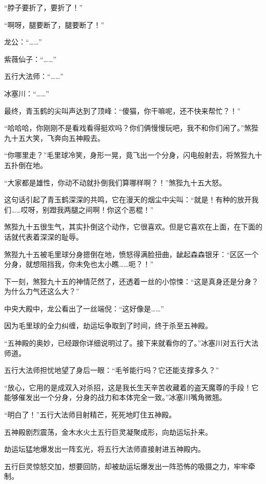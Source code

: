 \begin{this_body}
“脖子要折了，要折了！”

“啊呀，腿要断了，腿要断了！”

龙公：“……”

紫薇仙子：“……”

五行大法师：“……”

冰塞川：“……”

最终，青玉鹤的尖叫声达到了顶峰：“傻猫，你干嘛呢，还不快来帮忙？！”

“哈哈哈，你刚刚不是看戏看得挺欢吗？你们俩慢慢玩吧，我不和你们闹了。”煞狴九十五大笑，飞奔向五神殿去。

“你哪里走？”毛里球冷笑，身形一晃，竟飞出一个分身，闪电般射去，将煞狴九十五扑倒在地。

“大家都是雄性，你动不动就扑倒我们算哪样啊？！”煞狴九十五大怒。

这句话引起了青玉鹤深深的共鸣，它在漫天的烟尘中尖叫：“就是！有种的放开我们……哎呀，别蹬我两腿之间啊！你这个恶棍！”

煞狴九十五很生气，其实扑倒这个动作，它很喜欢。但是它喜欢在上面，在下面的话就代表着深深的耻辱。

煞狴九十五被毛里球分身摁倒在地，愤怒得满脸扭曲，龇起森森银牙：“区区一个分身，就想阻挡我，你未免也太小瞧……呃？！”

下一刻，煞狴九十五的神情茫然了，还透着一丝的小惊悚：“这是真身还是分身？为什么力气还这么大？”

中央大殿中，龙公看出了一丝端倪：“这好像是……”

因为毛里球的全力纠缠，劫运坛争取到了时间，终于杀至五神殿。

“五神殿的奥妙，已经跟你详细说明过了。接下来就看你的了。”冰塞川对五行大法师道。

五行大法师担忧地望了身后一眼：“毛爷能行吗？它还能支撑多久？”

“放心，它用的是成双入对杀招，这是我长生天辛苦收藏着的盗天魔尊的手段！它能够催发出一个分身，分身的战力和本体完全一致。”冰塞川嘴角微翘。

“明白了！”五行大法师目射精芒，死死地盯住五神殿。

五神殿剧烈震荡，金木水火土五行巨灵凝聚成形，向劫运坛扑来。

劫运坛猛地爆发出一阵玄光，将五行大法师直接射进五神殿内。

五行巨灵惊怒交加，想要回防，却被劫运坛爆发出一阵恐怖的吸摄之力，牢牢牵制。

\end{this_body}

